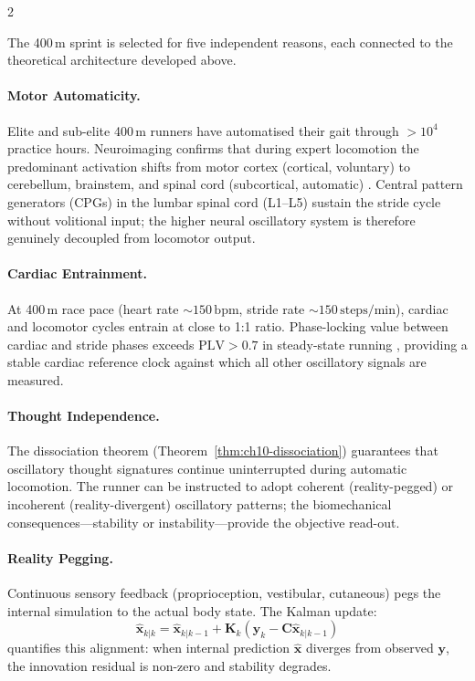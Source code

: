 \begin{multicols}{2}

The 400\,m sprint is selected for five independent reasons, each connected to the theoretical architecture developed above.

\paragraph{Motor Automaticity.}
Elite and sub-elite 400\,m runners have automatised their gait through $>10^4$ practice hours. Neuroimaging confirms that during expert locomotion the predominant activation shifts from motor cortex (cortical, voluntary) to cerebellum, brainstem, and spinal cord (subcortical, automatic) \citep{hikosaka2002central}. Central pattern generators (CPGs) in the lumbar spinal cord (L1--L5) sustain the stride cycle without volitional input; the higher neural oscillatory system is therefore genuinely decoupled from locomotor output.

\paragraph{Cardiac Entrainment.}
At 400\,m race pace (heart rate $\sim\!150\,\mathrm{bpm}$, stride rate $\sim\!150\,\mathrm{steps/min}$), cardiac and locomotor cycles entrain at close to 1:1 ratio. Phase-locking value between cardiac and stride phases exceeds $\mathrm{PLV} > 0.7$ in steady-state running \citep{niizeki1993intramuscular}, providing a stable cardiac reference clock against which all other oscillatory signals are measured.

\paragraph{Thought Independence.}
The dissociation theorem (Theorem~\ref{thm:ch10-dissociation}) guarantees that oscillatory thought signatures continue uninterrupted during automatic locomotion. The runner can be instructed to adopt coherent (reality-pegged) or incoherent (reality-divergent) oscillatory patterns; the biomechanical consequences---stability or instability---provide the objective read-out.

\paragraph{Reality Pegging.}
Continuous sensory feedback (proprioception, vestibular, cutaneous) pegs the internal simulation to the actual body state. The Kalman update:
\begin{equation}
\hat{\mathbf{x}}_{k|k} = \hat{\mathbf{x}}_{k|k-1} + \mathbf{K}_k\!\left(\mathbf{y}_k - \mathbf{C}\hat{\mathbf{x}}_{k|k-1}\right)
\end{equation}
quantifies this alignment: when internal prediction $\hat{\mathbf{x}}$ diverges from observed $\mathbf{y}$, the innovation residual is non-zero and stability degrades.


\end{multicols}
